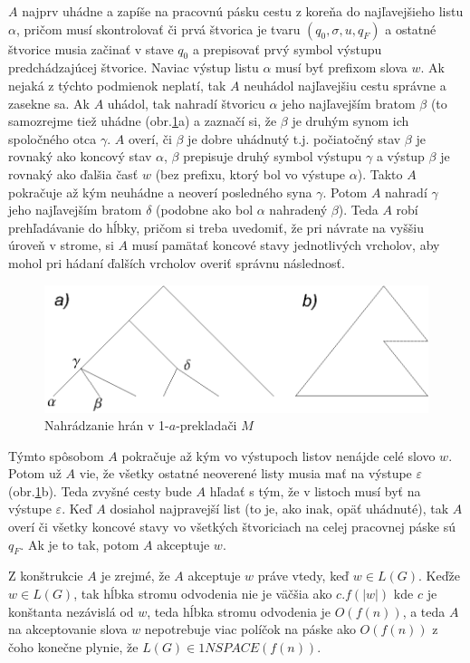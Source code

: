 \begin{dokaz}
  $A$ najprv uhádne a zapíše na pracovnú pásku cestu z koreňa do
  najľavejšieho listu $\alpha$, pričom musí skontrolovať či prvá
  štvorica je tvaru $(q_0,\sigma,u,q_F)$ a ostatné štvorice musia
  začinať v stave $q_0$ a prepisovať prvý symbol výstupu
  predchádzajúcej štvorice. Naviac výstup listu $\alpha$ musí byť
  prefixom slova $w$. Ak nejaká z týchto podmienok neplatí, tak $A$
  neuhádol najľavejšiu cestu správne a zasekne sa. Ak $A$ uhádol,
  tak nahradí štvoricu $\alpha$ jeho najľavejším bratom $\beta$ (to
  samozrejme tiež uhádne (obr.\ref{gs_obr_nstrom}a) a zaznačí si, že
  $\beta$ je druhým synom ich spoločného otca $\gamma$. $A$ overí,
  či $\beta$ je dobre uhádnutý t.j. počiatočný stav $\beta$ je
  rovnaký ako koncový stav $\alpha$,  $\beta$ prepisuje druhý symbol
  výstupu $\gamma$ a výstup $\beta$ je rovnaký ako ďalšia časť $w$
  (bez prefixu, ktorý bol vo výstupe $\alpha$). Takto $A$ pokračuje
  až kým neuhádne a neoverí posledného syna $\gamma$. Potom $A$
  nahradí $\gamma$ jeho najľavejším bratom $\delta$ (podobne ako bol
  $\alpha$ nahradený $\beta$). Teda $A$ robí prehľadávanie do hĺbky,
  pričom si treba uvedomiť, že pri návrate na vyššiu úroveň v
  strome, si $A$ musí pamätať koncové stavy jednotlivých vrcholov,
  aby mohol pri hádaní ďalších vrcholov overiť správnu následnosť.

  \begin{figure}[!ht]
  \centering
  \includegraphics{img/gsystems/nstrom}
  \caption{Nahrádzanie hrán v 1-$a$-prekladači $M$} \label{gs_obr_nstrom}
  \end{figure}

  Týmto spôsobom $A$ pokračuje až kým vo výstupoch listov nenájde
  celé slovo $w$. Potom už $A$ vie, že všetky ostatné neoverené
  listy musia mať na výstupe $\varepsilon$ (obr.\ref{gs_obr_nstrom}b). Teda
  zvyšné cesty bude $A$ hľadať s tým, že v listoch musí byť na
  výstupe $\varepsilon$. Keď $A$ dosiahol najpravejší list (to je,
  ako inak, opäť uhádnuté), tak $A$ overí či všetky koncové stavy vo
  všetkých štvoriciach na celej pracovnej páske sú $q_F$. Ak je to
  tak, potom $A$ akceptuje $w$.

  Z konštrukcie $A$ je zrejmé, že $A$ akceptuje $w$ práve vtedy, keď
  $w\in L(G)$. Keďže $w\in L(G)$, tak hĺbka stromu odvodenia nie je
  väčšia ako $c.f(|w|)$ kde $c$ je konštanta nezávislá od $w$, teda
  hĺbka stromu odvodenia je $O(f(n))$, a teda $A$ na akceptovanie
  slova $w$ nepotrebuje viac políčok na páske ako $O(f(n))$ z čoho
  konečne plynie, že $L(G)\in 1NSPACE(f(n))$.
\end{dokaz}

